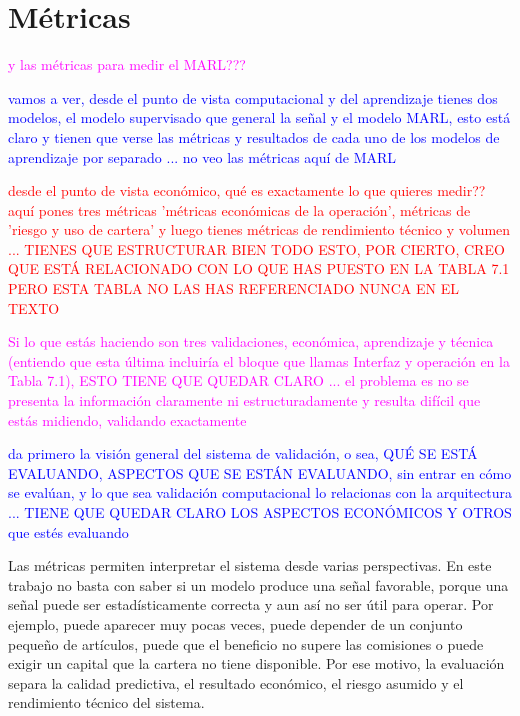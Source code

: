 \section{Métricas}
\label{sec:metricas-experimentacion}

\textcolor{magenta}{y las métricas para medir el MARL???}

\textcolor{blue}{vamos a ver, desde el punto de vista computacional y del aprendizaje tienes dos modelos, el modelo supervisado que general la señal y el modelo MARL, esto está claro y tienen que verse las métricas y resultados de cada uno de los modelos de aprendizaje por separado ... no veo las métricas aquí de MARL}

\textcolor{red}{desde el punto de vista económico, qué es exactamente lo que quieres medir?? aquí pones tres métricas 'métricas económicas de la operación', métricas de 'riesgo y uso de cartera' y luego tienes métricas de rendimiento técnico y volumen ... TIENES QUE ESTRUCTURAR BIEN TODO ESTO, POR CIERTO, CREO QUE ESTÁ RELACIONADO CON LO QUE HAS PUESTO EN LA TABLA 7.1 PERO ESTA TABLA NO LAS HAS REFERENCIADO NUNCA EN EL TEXTO }

\textcolor{magenta}{Si lo que estás haciendo son tres validaciones, económica, aprendizaje y técnica (entiendo que esta última incluiría el bloque que llamas Interfaz y operación en la Tabla 7.1), ESTO TIENE QUE QUEDAR CLARO ... el problema es no se presenta la información claramente ni estructuradamente y resulta difícil que estás midiendo, validando exactamente}

\textcolor{blue}{da primero la visión general del sistema de validación, o sea, QUÉ SE ESTÁ EVALUANDO, ASPECTOS QUE SE ESTÁN EVALUANDO, sin entrar en cómo se evalúan, y lo que sea validación computacional lo relacionas con la arquitectura ... TIENE QUE QUEDAR CLARO LOS ASPECTOS ECONÓMICOS Y OTROS que estés evaluando}


Las métricas permiten interpretar el sistema desde varias perspectivas. En este trabajo no basta con saber si un modelo produce una señal favorable, porque una señal puede ser estadísticamente correcta y aun así no ser útil para operar. Por ejemplo, puede aparecer muy pocas veces, puede depender de un conjunto pequeño de artículos, puede que el beneficio no supere las comisiones o puede exigir un capital que la cartera no tiene disponible. Por ese motivo, la evaluación separa la calidad predictiva, el resultado económico, el riesgo asumido y el rendimiento técnico del sistema.

